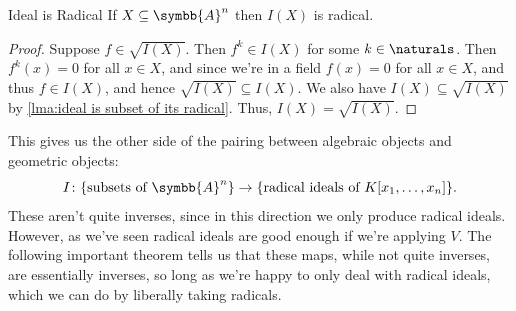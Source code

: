 \documentclass[fleqn]{NotesClass}
\newcommand{\affine}{\symbb{A}}
\begin{document}
    \begin{lma}{Ideal is Radical}{}
        If \(X \subseteq \affine^n\) then \(I(X)\) is radical.
        \begin{proof}
            Suppose \(f \in \sqrt{I(X)}\).
            Then \(f^k \in I(X)\) for some \(k \in \naturals\).
            Then \(f^k(x) = 0\) for all \(x \in X\), and since we're in a field \(f(x) = 0\) for all \(x \in X\), and thus \(f \in I(X)\), and hence \(\sqrt{I(X)} \subseteq I(X)\).
            We also have \(I(X) \subseteq \sqrt{I(X)}\) by \cref{lma:ideal is subset of its radical}.
            Thus, \(I(X) = \sqrt{I(X)}\).
        \end{proof}
    \end{lma}
    
    \begin{remark}{}{}
        This gives us the other side of the pairing between algebraic objects and geometric objects:
        \begin{equation}
            I \colon \{\text{subsets of } \affine^n\} \to \{\text{radical ideals of } K[x_1, \dotsc, x_n]\}.
        \end{equation}
        These aren't quite inverses, since in this direction we only produce radical ideals.
        However, as we've seen radical ideals are good enough if we're applying \(V\).
        The following important theorem tells us that these maps, while not quite inverses, are essentially inverses, so long as we're happy to only deal with radical ideals, which we can do by liberally taking radicals.
    \end{remark}
    
\end{document}
